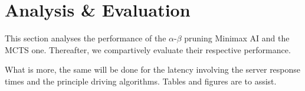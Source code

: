 \section{Analysis \& Evaluation} \label{analysis}

This section analyses the performance of the $\alpha$-$\beta$ pruning Minimax AI and the MCTS one. 
Thereafter, we compartively evaluate their respective performance. 

What is more, the same will be done for the latency involving the server response times
and the principle driving algorithms. Tables and figures are to assist. 